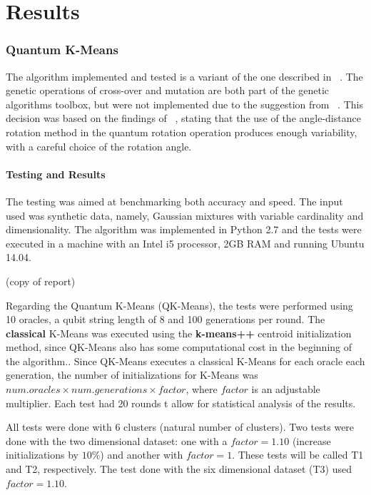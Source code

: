 
\chapter{Results}
\label{chapter:results}
\subsection{Quantum K-Means}


The algorithm implemented and tested is a variant of the one described in ~\cite{Casper}. The genetic operations of cross-over and mutation are both part of the genetic algorithms toolbox, but were not implemented due to the suggestion from ~\cite{Wiebe2014}. This decision was based on the findings of ~\cite{Liu2010}, stating that the use of the angle-distance rotation method in the quantum rotation operation produces enough variability, with a careful choice of the rotation angle.

\subsubsection{Testing and Results}
The testing was aimed at benchmarking both accuracy and speed. The input used was synthetic data, namely, Gaussian mixtures with variable cardinality and dimensionality. The algorithm was implemented in Python 2.7 and the tests were executed in a machine with an Intel i5 processor, 2GB RAM and running Ubuntu 14.04.

(copy of report)

Regarding the Quantum K-Means (QK-Means), the tests were performed using 10 oracles, a qubit string length of 8 and 100 generations per round. The \textbf{classical} K-Means was executed using the \textbf{k-means++} centroid initialization method, since QK-Means also has some computational cost in the beginning of the algorithm.. Since QK-Means executes a classical K-Means for each oracle each generation, the number of initializations for K-Means was $num.oracles \times num.generations \times factor$, where $factor$ is an adjustable multiplier. Each test had 20 rounds t allow for statistical analysis of the results.

All tests were done with 6 clusters (natural number of clusters). Two tests were done with the two dimensional dataset: one with a $factor=1.10$ (increase initializations by $10\%$) and another with $factor=1$. These tests will be called T1 and T2, respectively. The test done with the six dimensional dataset (T3) used $factor=1.10$.

